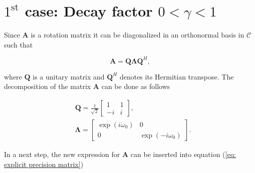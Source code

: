 \documentclass[11pt,a4paper,twoside]{report}
\newcommand{\mat}[1]{\mathbf{#1}}
\begin{document}
\section{ $1^{\text{st}}$ case: Decay factor $0<\gamma< 1$ }

Since $\mat{A}$ is a rotation matrix it can be diagonalized in an orthonormal basis in $\mathcal{C}$ such that

\begin{equation}
	\mat{A} = \mat{Q\Lambda}\mat{Q}^H,
\end{equation}

where $\mat{Q}$ is a unitary matrix and $\mat{Q}^H$ denotes  its Hermitian transpose. The decomposition of the matrix $\mat{A}$ can be done as follows

\begin{align*}
	&\mat{Q} = \frac{1}{\sqrt{2}}
		\begin{bmatrix}
			1 & 1 \\
			-i & i
		\end{bmatrix},
	\\
	&\mat{\Lambda} = 
		\begin{bmatrix}
			\exp{(i\omega_0)} & 0 \\
			0 & \exp{(-i\omega_0)}
		\end{bmatrix}.
\end{align*}


In a next step, the new expression for $\mat{A}$ can be inserted into equation (\ref{eq: explicit precision matrix}) \cite{ST:Malmberg}
\end{document}

